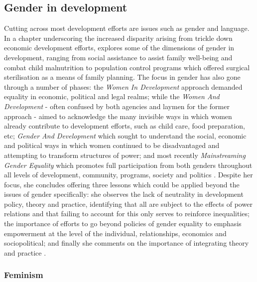 \subsection{Gender in development}
Cutting across most development efforts are issues such as gender and language. In a chapter underscoring the increased disparity arising from trickle down economic development efforts, \citet{Martinez2009} explores some of the dimensions of gender in development, ranging from social assistance to assist family well-being and combat child malnutrition to population control programs which offered surgical sterilisation as a means of family planning. The focus in gender has also gone through a number of phases: the \textit{Women In Development} approach demanded equality in economic, political and legal realms; while the \textit{Women And Development} - often confused by both agencies and laymen for the former approach - aimed to acknowledge the many invisible ways in which women already contribute to development efforts, such as child care, food preparation, etc; \textit{Gender And Development} which sought to understand the social, economic and political ways in which women continued to be disadvantaged and attempting to transform structures of power; and most recently \textit{Mainstreaming Gender Equality} which promotes full participation from both genders throughout all levels of development, community, programs, society and politics \citep{Martinez2009}. Despite her focus, she concludes offering three lessons which could be applied beyond the issues of gender specifically: she observes the lack of neutrality in development policy, theory and practice, identifying that all are subject to the effects of power relations and that failing to account for this only serves to reinforce inequalities; the importance of efforts to go beyond policies of gender equality to emphasis empowerment at the level of the individual, relationships, economics and sociopolitical; and finally she comments on the importance of integrating theory and practice \citep{Martinez2009}. 

\subsubsection{Feminism} %

